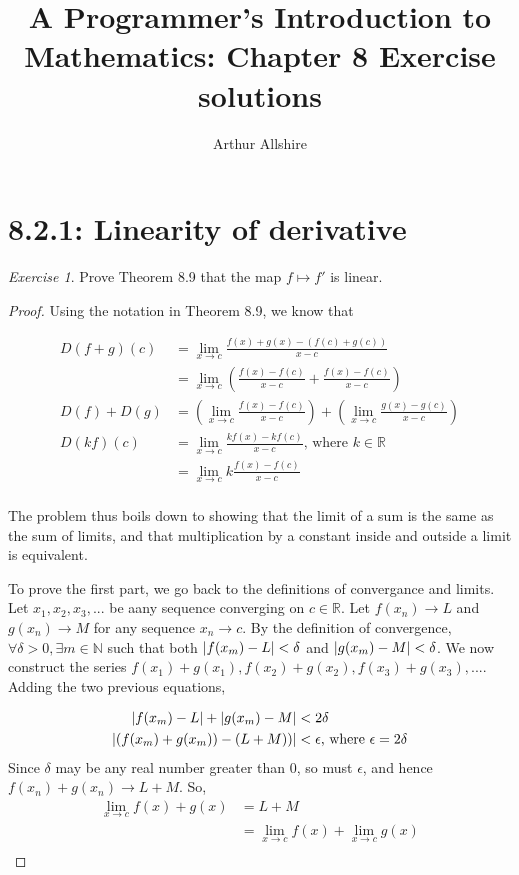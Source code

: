 \documentclass{article}
\author{Arthur Allshire}
\title{A Programmer's Introduction to Mathematics: Chapter 8 Exercise solutions}
\DeclarePairedDelimiter\abs{\lvert}{\rvert}%
\theoremstyle{remark}
\newtheorem*{exercise}{Exercise}
\begin{document}
\maketitle

\section*{8.2.1: Linearity of derivative}
\begin{exercise}
    Prove Theorem 8.9 that the map $f \mapsto f'$ is linear.
\end{exercise}

\begin{proof}
Using the notation in Theorem 8.9, we know that

\[
\begin{aligned}
    D(f+g)(c) &= \lim_{x \to c} \frac{f(x)+g(x) - (f(c) + g(c))}{x-c} \\
              &= \lim_{x \to c} (\frac{f(x)-f(c)}{x-c} + \frac{f(x)-f(c)}{x-c}) \\
    D(f)+D(g) &= (\lim_{x \to c} \frac{f(x)-f(c)}{x-c}) + (\lim_{x \to c} \frac{g(x)-g(c)}{x-c}) \\
    D(kf)(c) &= \lim_{x \to c} \frac{kf(x) - kf(c)}{x-c} \text{, where } k \in \mathbb{R} \\
             &= \lim_{x \to c} k \frac{f(x)-f(c)}{x-c} \\
\end{aligned}
\]

The problem thus boils down to showing that the limit of a sum is the same as the sum of limits,
and that multiplication by a constant inside and outside a limit is equivalent.

To prove the first part, we go back to the definitions of convergance and limits. Let
$x_1, x_2, x_3, ...$ be aany sequence converging on $c \in \mathbb{R}$.
Let $f(x_n) \rightarrow L$ and $g(x_n) \rightarrow M$ for any sequence $x_n \rightarrow c$.
By the definition of convergence,
$\forall \delta > 0, \exists m \in \mathbb{N}$ such that both
$\abs{f(x_m) - L} < \delta$ and $\abs{g(x_m) - M} < \delta$.
We now construct the series $f(x_1)+g(x_1), f(x_2)+g(x_2), f(x_3)+g(x_3), ...$.
Adding the two previous equations,

\[
\begin{aligned}
    \abs{f(x_m)-L} + \abs{g(x_m)-M} &< 2\delta \\
    \abs{(f(x_m)+g(x_m))-(L+M))} &< \epsilon \text{, where } \epsilon = 2\delta \\
\end{aligned}
\]
Since $\delta$ may be any real number greater than 0, so must $\epsilon$, and hence
$f(x_n)+g(x_n) \rightarrow L+M$. So,
\[
\begin{aligned}
    \lim_{x \to c} f(x) + g(x) &= L+M \\
    &= \lim_{x \to c} f(x) + \lim_{x \to c} g(x) \\
\end{aligned}

\]

\end{proof}
\end{document}

